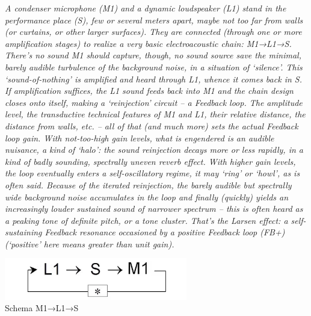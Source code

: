 \begin{center}
\vspace{0.5cm}
\textit{A condenser microphone (M1) and a dynamic loudspeaker (L1) stand in the performance place
(S), few or several meters apart, maybe not too far from walls (or curtains, or other larger
surfaces). They are connected (through one or more amplification stages) to realize a very
basic electroacoustic chain: M1→L1→S. There’s no sound M1 should capture, though, no sound
source save the minimal, barely audible turbulence of the background noise, in a situation of
‘silence’. This ‘sound-of-nothing’ is amplified and heard through L1, whence it comes back in
S. \\
If amplification suffices, the L1 sound feeds back into M1 and the chain design closes onto
itself, making a ‘reinjection’ circuit – a Feedback loop. The amplitude level, the
transductive technical features of M1 and L1, their relative distance, the distance from
walls, etc. – all of that (and much more) sets the actual Feedback loop gain. With
not-too-high gain levels, what is engendered is an audible nuisance, a kind of ‘halo’: the
sound reinjection decays more or less rapidly, in a kind of badly sounding, spectrally uneven
reverb effect. With higher gain levels, the loop eventually enters a self-oscillatory regime,
it may ‘ring’ or ‘howl’, as is often said. Because of the iterated reinjection, the barely
audible but spectrally wide background noise accumulates in the loop and finally (quickly)
yields an increasingly louder sustained sound of narrower spectrum – this is often heard as a
peaking tone of definite pitch, or a tone cluster. That’s the Larsen effect: a self-sustaining
Feedback resonance occasioned by a positive Feedback loop (FB+) (‘positive’ here means greater
than unit gain).}
\vspace{0.5cm}
\vspace{0.5cm}
\end{center}

\begin{center}
\vspace{0.5cm}
\includegraphics[width=8cm]{figures/larsen_Feedback_scheme.png} \\
{Schema M1→L1→S} \\ 
\vspace{0.5cm}
\end{center}

